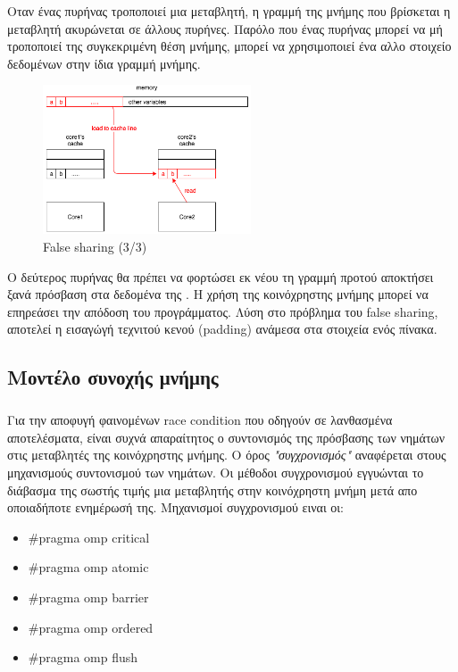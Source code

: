 \documentclass[12pt]{article}
\newcommand{\en}[1]{\foreignlanguage{english}{#1}}
\begin{document}
Οταν ένας πυρήνας τροποποιεί μια μεταβλητή, η γραμμή της μνήμης που βρίσκεται η μεταβλητή ακυρώνεται σε άλλους πυρήνες. Παρόλο που ένας πυρήνας μπορεί να μή τροποποιεί της συγκεκριμένη θέση μνήμης, μπορεί να χρησιμοποιεί ένα αλλο στοιχείο δεδομένων στην ίδια γραμμή μνήμης. 
\clearpage
\begin{figure}
	\centering
	\includegraphics[width=0.55\textwidth]{false_sharing_4}
	\captionsetup{justification=centering, singlelinecheck=false}
	\caption{\en{False sharing (3/3)}}
\label{fig:false_sharing_4}
\end{figure}
Ο δεύτερος πυρήνας θα πρέπει να φορτώσει εκ νέου τη γραμμή προτού αποκτήσει ξανά πρόσβαση στα δεδομένα της . Η χρήση της κοινόχρηστης μνήμης μπορεί να επηρεάσει την απόδοση του προγράμματος\cite{false_sharing}.
Λύση στο πρόβλημα του \en{false sharing}, αποτελεί η εισαγώγή τεχνιτού κενού (\en{padding}) ανάμεσα στα στοιχεία ενός πίνακα.
\ \\
\subsection{Μοντέλο συνοχής μνήμης}
\subparagraph{}
Για την αποφυγή φαινομένων \en{race condition} που οδηγούν σε λανθασμένα αποτελέσματα, είναι συχνά απαραίτητος ο συντονισμός της πρόσβασης των νημάτων στις μεταβλητές της κοινόχρηστης μνήμης. Ο όρος \emph{"συγχρονισμός"} αναφέρεται στους μηχανισμούς συντονισμού των νημάτων. Οι μέθοδοι συγχρονισμού εγγυώνται το διάβασμα της σωστής τιμής μια μεταβλητής στην κοινόχρηστη μνήμη μετά απο οποιαδήποτε ενημέρωσή της. Μηχανισμοί συγχρονισμού ειναι οι\cite{book2_23}:
\begin{itemize}
    \item {\#}pragma omp critical 
    \item {\#}pragma omp atomic
    \item {\#}pragma omp barrier 
    \item {\#}pragma omp ordered
    \item {\#}pragma omp flush
\end{itemize}
\end{document}
